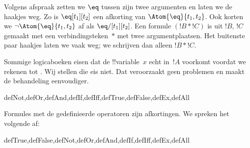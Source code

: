 \documentclass[../../../include/open-logic-section]{subfiles}
\begin{document}
Volgens afspraak zetten we $\eq$ tussen zijn twee argumenten en laten
we de haakjes weg. Zo is $\eq[t_1][t_2]$ een afkorting van
$\Atom{\eq}{t_1,t_2}$. Ook korten we $\lnot \Atom{\eq}{t_1,t_2}$ af
als $\eq/[t_1][t_2]$. Een formule $(!B \ast !C)$ is uit $!B$, $!C$
gemaakt met een verbindingsteken~$\ast$ met twee argumentplaatsen. Het
buitenste paar haakjes laten we vaak weg; we schrijven dan alleen
$!B \ast !C$.

\begin{intro}
Sommige logicaboeken eisen dat de !!{variable}~$x$ echt in~$!A$
voorkomt voordat we
%
%
%
rekenen tot
.
Wij stellen die eis niet. Dat veroorzaakt geen problemen en maakt de
behandeling eenvoudiger.
\end{intro}

\begin{tagblock}{defNot,defOr,defAnd,defIf,defIff,defTrue,defFalse,defEx,defAll}
\begin{defn}
Formules met de gedefinieerde operatoren zijn afkortingen. We spreken
het volgende af:

\begin{tagenumerate}{defTrue,defFalse,defNot,defOr,defAnd,defIf,defIff,defEx,defAll}









\end{tagenumerate}
\end{defn}
\end{tagblock}
\end{document}
